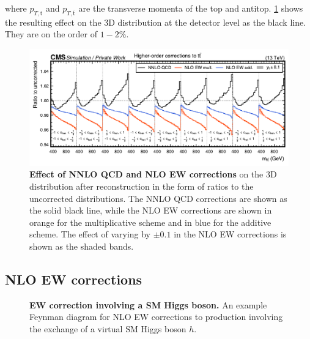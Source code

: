 \noindent where $p_{T,\mathrm{t}}$ and $p_{T,\mathrm{\bar{t}}}$ are the transverse momenta of the top and antitop. \cref{fig:ah:ewqcdcorrs} shows the resulting effect on the 3D \mttchelchan distribution at the detector level as the black line. They are on the order of $1-2\%$.

\begin{figure}[t]
    \centering
    \includegraphics[width=0.99\linewidth]{figures/ah/ewqcdcorrs.pdf}
    \caption{\textbf{Effect of NNLO QCD and NLO EW corrections} on the 3D \mttchelchan distribution after reconstruction in the form of ratios to the uncorrected distributions. The NNLO QCD corrections are shown as the solid black line, while the NLO EW corrections are shown in orange for the multiplicative scheme and in blue for the additive scheme. The effect of varying \yt by $\pm 0.1$ in the NLO EW corrections is shown as the shaded bands.}
    \label{fig:ah:ewqcdcorrs}
\end{figure}

\subsection{NLO EW corrections}
\label{sec:ah:ewcorr}

\begin{figure}[t]
    \centering
    \caption{\textbf{EW correction involving a SM Higgs boson.} An example Feynman diagram for NLO EW corrections to \ttbar production involving the exchange of a virtual SM Higgs boson $h$.}
    \label{fig:ah:ewcorr_feynman}
\end{figure}

